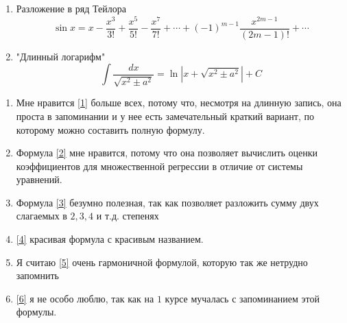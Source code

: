 \documentclass[12pt, a4paper]{article}
\begin{document}
\begin{enumerate}
\item Разложение в ряд Тейлора
\[ \sin x = x - \frac{x^3}{3!}+\frac{x^5}{5!}-\frac{x^7}{7!}+ \cdots +(-1)^{m-1}\frac{x^{2m-1}}{(2m-1)!}+ \cdots \tag{æææææ}\label{5}
\] 
\item "Длинный логарифм" \[ \int \frac{dx}{\sqrt{x^2 \pm a^2}}= \ln|x+\sqrt{x^2 \pm a^2}|+C \tag{ææææææ}\label{6}
\]
\end{enumerate}


\begin{enumerate}
\item Мне нравится \eqref{1} больше всех, потому что, несмотря на длинную запись, она проста в запоминании и у нее есть замечательный краткий вариант, по которому можно составить полную формулу.
\item Формула \eqref{2} мне нравится, потому что она позволяет вычислить оценки коэффициентов для множественной регрессии в отличие от системы уравнений.
\item Формула \eqref{3} безумно полезная, так как позволяет разложить сумму двух слагаемых в $2,3,4$ и т.д. степенях
\item \eqref{4} красивая формула с красивым названием.
\item Я считаю \eqref{5} очень гармоничной формулой, которую так же нетрудно запомнить
\item \eqref{6} я не особо люблю, так как на $1$ курсе мучалась с запоминанием этой формулы. 
\end{enumerate}
\end{document}
